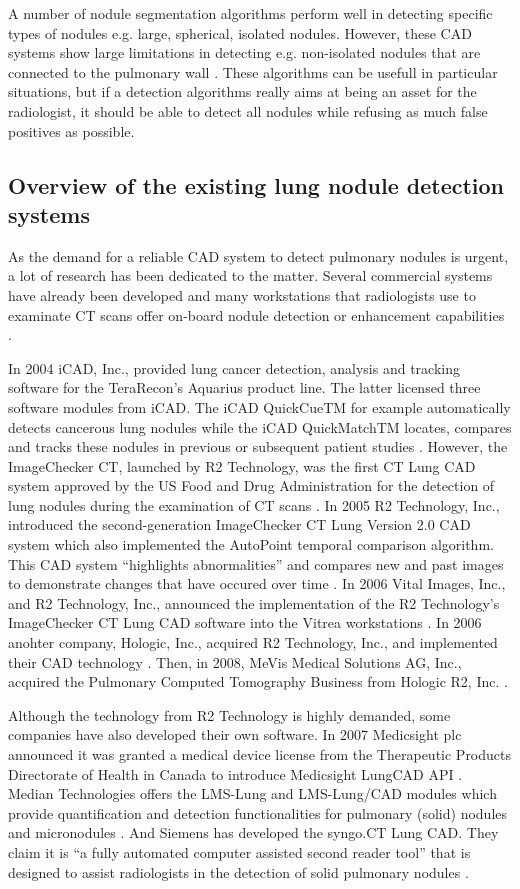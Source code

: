 A number of nodule segmentation algorithms perform well in detecting specific
types of nodules e.g. large, spherical, isolated nodules. However, these CAD
systems show large limitations in detecting e.g. non-isolated nodules that are
connected to the pulmonary wall \cite{keshani}. These algorithms can be usefull
in particular situations, but if a detection algorithms really aims at being an
asset for the radiologist, it should be able to detect all nodules while
refusing as much false positives as possible.

\subsection{Overview of the existing lung nodule detection systems}
As the demand for a reliable CAD system to detect pulmonary nodules is urgent, a
lot of research has been dedicated to the matter. Several commercial systems
have already been developed and many workstations that radiologists use to
examinate CT scans offer on-board nodule detection or enhancement capabilities
\cite{ginneken}.

In 2004 iCAD, Inc., provided lung cancer detection, analysis and tracking
software for the TeraRecon's Aquarius product line. The latter licensed three
software modules from iCAD. The iCAD QuickCueTM for example automatically
detects cancerous lung nodules while the iCAD QuickMatchTM locates, compares and tracks these
nodules in previous or subsequent patient studies \cite{tera}.
However, the ImageChecker CT, launched by R2 Technology, was the first CT Lung
CAD system approved by the US Food and Drug Administration for the detection of
lung nodules during the examination of CT scans \cite{Mevis}. In 2005 R2
Technology, Inc., introduced the second-generation ImageChecker CT Lung Version 2.0 CAD system which also implemented the AutoPoint temporal comparison algorithm. This CAD system ``highlights abnormalities'' and compares new and past images to
demonstrate changes that have occured over time \cite{diag} \cite{r2}.
In 2006 Vital Images, Inc., and R2 Technology, Inc., announced the
implementation of the R2 Technology's ImageChecker CT Lung CAD software into
the Vitrea workstations \cite{vital}. In 2006 anohter company, Hologic, Inc.,
acquired R2 Technology, Inc., and implemented their CAD technology
\cite{Hologic}. Then, in 2008, MeVis Medical Solutions AG, Inc., acquired the
Pulmonary Computed Tomography Business from Hologic R2, Inc. \cite{Mevis}. 


Although the technology from R2 Technology is highly demanded, some companies
have also developed their own software. In 2007 Medicsight plc announced it was
granted a medical device license from the Therapeutic Products Directorate of
Health in Canada to introduce Medicsight LungCAD API \cite{HI}.
Median Technologies offers the LMS-Lung and LMS-Lung/CAD modules which provide
quantification and detection functionalities for pulmonary (solid) nodules and
micronodules \cite{median}. And Siemens has developed the syngo.CT Lung CAD.
They claim it is ``a fully automated computer assisted second reader tool'' that is designed to assist radiologists in
the detection of solid pulmonary nodules \cite{siemens}.

